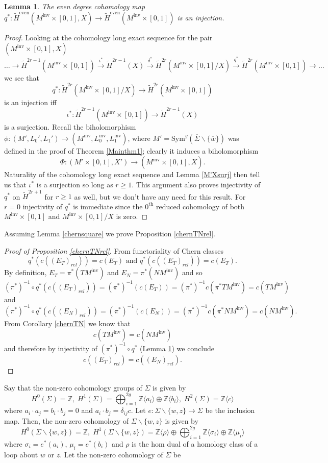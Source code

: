 \documentclass[11pt]{amsart}
\newtheorem{lemma}[theorem]{Lemma}
\theoremstyle{definition}
\theoremstyle{remark}
\def\Z{\mathbb{Z}}
\def\Sym{\mathrm{Sym}}
\newcommand{\M}{M^{\operatorname{inv}}}
\newcommand{\Lo}{L_0^{\operatorname{inv}}}
\newcommand{\Li}{L_1^{\operatorname{inv}}}
\numberwithin{equation}{section}
\begin{document}
\begin{lemma}\label{injection}
The even degree cohomology map $q^*\colon \widetilde{H}^{\textrm{even}}(\M\times [0,1],X)\to \widetilde{H}^{\textrm{even}}(\M\times[0,1])$ is an injection.
\end{lemma}
\begin{proof}
Looking at the cohomology long exact sequence for the pair $(\M\times[0,1],X)$
\[\hdots\to \widetilde{H}^{2r-1}(\M\times[0,1])\xrightarrow{\iota^*}\widetilde{H}^{2r-1}(X)\xrightarrow{\delta^*}\widetilde{H}^{2r}(\M\times[0,1]/X)\xrightarrow{q^*}\widetilde{H}^{2r}(\M\times[0,1])\to\hdots\]
we see that \[q^*\colon \widetilde{H}^{2r}(\M\times[0,1]/X)\to \widetilde{H}^{2r}(\M\times[0,1])\] is an injection iff \[\iota^*\colon \widetilde{H}^{2r-1}(\M\times[0,1])\to \widetilde{H}^{2r-1}(X)\] is a surjection. Recall the biholomorphism $\phi\colon (M', L_0', L_1')\to (\M, \Lo, \Li)$, where $M'=\Sym^g(\overline{\Sigma}\backslash \{\overline{w}\})$ was defined in the proof of Theorem \ref{Mainthm1}; clearly it induces a biholomorphism \[\Phi\colon (M'\times[0,1], X')\to (\M\times[0,1], X).\] Naturality of the cohomology long exact sequence and Lemma \ref{M'Xsurj} then tell us that $\iota^*$ is a surjection so long as $r\ge1$. This argument also proves injectivity of $q^*$ on $\widetilde{H}^{2r+1}$ for $r\ge1$ as well, but we don't have any need for this result.  For $r=0$ injectivity of $q^*$ is immediate since the $0^{\textrm{th}}$ reduced cohomology of both $\M\times[0,1]$ and $\M\times[0,1]/X$ is zero.
 \end{proof}

Assuming Lemma \ref{chernsquare} we prove Proposition \ref{chernTNrel}.

\begin{proof}[Proof of Proposition \ref{chernTNrel}]
From functoriality of Chern classes \[q^*(c((E_T)_{rel}))=c(E_T)\textrm{ and } q^*(c((E_T)_{rel}))=c(E_T).\] By definition, $E_T=\pi^*(T\M)$ and $E_N=\pi^*(N\M)$ and so \[(\pi^*)^{-1}\circ q^*(c((E_T)_{rel}))=(\pi^*)^{-1}(c(E_T))=(\pi^*)^{-1}c(\pi^* T\M)=c(T\M)\] and  \[(\pi^*)^{-1}\circ q^*(c((E_N)_{rel}))=(\pi^*)^{-1}(c(E_N))=(\pi^*)^{-1}c(\pi^* N\M)=c(N\M).\]From Corollary \ref{chernTN} we know that \[c(T\M)=c(N\M)\] and therefore by injectivity of $(\pi^*)^{-1}\circ q^*$ (Lemma \ref{injection}) we conclude  \[c((E_T)_{rel})=c((E_N)_{rel}).\]
\end{proof}

Say that the non-zero cohomology groups of $\Sigma$ is given by 
   \[H^0(\Sigma)=\Z,\;H^1(\Sigma)=\bigoplus_{i=1}^{2g}\Z\langle a_i\rangle\oplus \Z\langle b_i\rangle,\; H^2(\Sigma)= \Z\langle c\rangle\]
   where $a_i\cdot a_j=b_i\cdot b_j=0$ and $a_i\cdot b_j=\delta_{ij}c$.  Let $e\colon \Sigma\backslash\{w,z\}\to \Sigma$ be the inclusion map. Then,  the non-zero cohomology of $\Sigma\backslash\{w,z\}$ is given by 
   \[H^0(\Sigma\backslash\{w,z\})=\Z,\;H^1(\Sigma\backslash\{w,z\})=\Z\langle\rho\rangle\oplus\bigoplus_{i=1}^{2g}\Z\langle \sigma_i\rangle\oplus \Z\langle \mu_i\rangle\]
   where $\sigma_i=e^*(a_i)$, $\mu_i=e^*(b_i)$ and $\rho$ is the hom dual of a homology class of a loop about $w$ or $z$. Let the non-zero cohomology of  $\overline{\Sigma}$ be 
\end{document}
